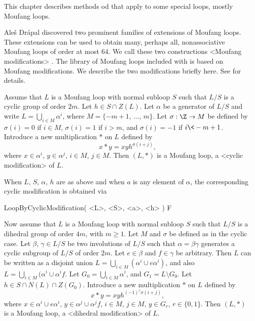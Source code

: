 
This chapter describes methods od {\LOOPS} that apply to some special loops,
mostly Moufang loops.


Ale\v{s} Dr\'apal discovered two prominent families of extensions of Moufang
loops. These extensions can be used to obtain many, perhaps all, nonassociative
Moufang loops of order at most $64$. We call these two constructions
<Moufang modifications>
%
%
. The library of Moufang loops included with
{\LOOPS} is based on Moufang modifications. We describe the two modifications
briefly here. See \cite{DV} for details.

Assume that $L$ is a Moufang loop with normal subloop $S$ such that $L/S$ is a
cyclic group of order $2m$. Let $h\in S\cap Z(L)$. Let $\alpha$ be a generator
of $L/S$ and write $L = \bigcup_{i\in M} \alpha^i$, where $M=\{-m+1$, $\dots$,
$m\}$. Let $\sigma:\Z\to M$ be defined by $\sigma(i)=0$ if $i\in M$,
$\sigma(i)=1$ if $i>m$, and $\sigma(i)=-1$ if $i\<-m+1$. Introduce a new
multiplication $\ast$ on $L$ defined by
$$
    x\ast y = xyh^{\sigma(i+j)},
$$
where $x\in \alpha^i$, $y\in\alpha^j$, $i\in M$, $j\in M$. Then $(L,\ast)$ is a
Moufang loop, a <cyclic modification>
%
%
 of $L$.

When $L$, $S$, $\alpha$, $h$ are as above and when $a$ is any element of
$\alpha$, the corresponding cyclic modification is obtained via

\>LoopByCyclicModification( <L>, <S>, <a>, <h> ) F

Now assume that $L$ is a Moufang loop with normal subloop $S$ such that $L/S$
is a dihedral group of order $4m$, with $m\ge 1$. Let $M$ and $\sigma$ be
defined as in the cyclic case. Let $\beta$, $\gamma\in L/S$ be two involutions
of $L/S$ such that $\alpha=\beta\gamma$ generates a cyclic subgroup of $L/S$ of
order $2m$. Let $e\in\beta$ and $f\in\gamma$ be arbitrary. Then $L$ can be
written as a disjoint union $L=\bigcup_{i\in M}(\alpha^i\cup e\alpha^i)$, and
also $L=\bigcup_{i\in M}(\alpha^i\cup \alpha^if$. Let $G_0=\bigcup_{i\in
M}\alpha^i$, and $G_1=L\setminus G_0$. Let $h\in S\cap N(L)\cap Z(G_0)$.
Introduce a new multiplication $\ast$ on $L$ defined by
$$
    x\ast y = xyh^{(-1)^r\sigma(i+j)},
$$
where $x\in\alpha^i\cup e\alpha^i$, $y\in\alpha^j\cup \alpha^jf$, $i\in M$,
$j\in M$, $y\in G_r$, $r\in\{0,1\}$. Then $(L,\ast)$ is a Moufang loop, a
<dihedral modification>
%
%
 of $L$.

